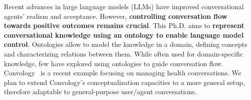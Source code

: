 \documentclass[a0paper,portrait]{baposter}
\begin{document}
\begin{poster}
{Recent advances in large language models (LLMs) have improved conversational agents' realism and acceptance. However, \textbf{controlling conversation flow towards positive outcomes remains crucial}. This Ph.D. aims to \textcolor{loriapink}{\bf represent conversational knowledge using an ontology to enable language model control}. Ontologies allow to model the knowledge in a domain, defining concepts and characterizing relations between them. While often used for domain-specific knowledge, few have explored using ontologies to guide conversation flow. Convology~\cite{convology} is a recent example focusing on managing health conversations. We plan to extend Convology's conceptualization capacities to a more general setup, therefore adaptable to general-purpose user/agent conversations.

}


\end{poster}
\end{document}
